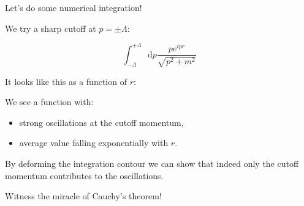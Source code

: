 \documentclass{beamer}
\newcommand{\integrand}{\frac{p e^{ipr}}{\sqrt{p^2 + m^2}}}
\newcommand{\diffop}{\mathop{}\!\mathrm{d}}
\newcommand{\dip}{\diffop p}
\begin{document}

\begin{frame}
Let's do some numerical integration!
\end{frame}


\begin{frame}
We try a sharp cutoff at $p = \pm \Lambda$:

$$\int_{-\Lambda}^{+\Lambda} \dip \integrand$$

It looks like this as a function of $r$:
\end{frame}






\begin{frame}
We see a function with:

\begin{itemize}
\pause
\item strong \alert{oscillations} at the cutoff momentum,

\pause
\item \alert{average value} falling \alert{exponentially} with $r$.
\end{itemize}

\pause
By deforming the integration contour we can show that indeed \alert{only}
the cutoff momentum contributes to the oscillations.
\end{frame}


\begin{frame}
Witness the miracle of \alert{Cauchy's theorem}!
\end{frame}



\end{document}
